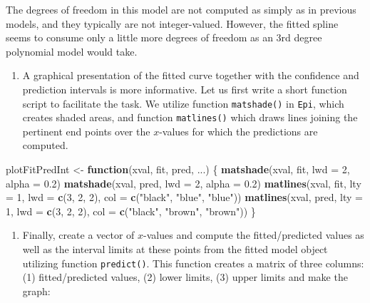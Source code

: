 \documentclass[
]{book}
\newenvironment{Shaded}{\begin{snugshade}}{\end{snugshade}}
\newcommand{\AttributeTok}[1]{\textcolor[rgb]{0.13,0.29,0.53}{#1}}
\newcommand{\ControlFlowTok}[1]{\textcolor[rgb]{0.13,0.29,0.53}{\textbf{#1}}}
\newcommand{\DecValTok}[1]{\textcolor[rgb]{0.00,0.00,0.81}{#1}}
\newcommand{\FloatTok}[1]{\textcolor[rgb]{0.00,0.00,0.81}{#1}}
\newcommand{\FunctionTok}[1]{\textcolor[rgb]{0.13,0.29,0.53}{\textbf{#1}}}
\newcommand{\NormalTok}[1]{#1}
\newcommand{\OtherTok}[1]{\textcolor[rgb]{0.56,0.35,0.01}{#1}}
\newcommand{\StringTok}[1]{\textcolor[rgb]{0.31,0.60,0.02}{#1}}
\providecommand{\tightlist}{%
  \setlength{\itemsep}{0pt}\setlength{\parskip}{0pt}}
\begin{document}
The degrees of freedom in this model are not computed as simply as in previous
models, and they typically are not integer-valued. However,
the fitted spline seems to consume only a little more degrees of freedom
as an 3rd degree polynomial model would take.

\begin{enumerate}
\def\labelenumi{\arabic{enumi}.}
\setcounter{enumi}{1}
\tightlist
\item
  A graphical presentation of the fitted curve together with the
  confidence and prediction intervals is more informative.
  Let us first write a
  short function script to facilitate the task. We utilize function \texttt{matshade()} in \texttt{Epi}, which creates shaded areas, and function \texttt{matlines()} which draws
  lines joining the pertinent end points over the \(x\)-values for which the
  predictions are computed.
\end{enumerate}

\begin{Shaded}
\begin{Highlighting}[]
\NormalTok{plotFitPredInt }\OtherTok{\textless{}{-}} \ControlFlowTok{function}\NormalTok{(xval, fit, pred, ...) \{}
  \FunctionTok{matshade}\NormalTok{(xval, fit, }\AttributeTok{lwd =} \DecValTok{2}\NormalTok{, }\AttributeTok{alpha =} \FloatTok{0.2}\NormalTok{)}
  \FunctionTok{matshade}\NormalTok{(xval, pred, }\AttributeTok{lwd =} \DecValTok{2}\NormalTok{, }\AttributeTok{alpha =} \FloatTok{0.2}\NormalTok{)}
  \FunctionTok{matlines}\NormalTok{(xval, fit, }\AttributeTok{lty =} \DecValTok{1}\NormalTok{, }\AttributeTok{lwd =} \FunctionTok{c}\NormalTok{(}\DecValTok{3}\NormalTok{, }\DecValTok{2}\NormalTok{, }\DecValTok{2}\NormalTok{), }\AttributeTok{col =} \FunctionTok{c}\NormalTok{(}\StringTok{"black"}\NormalTok{, }\StringTok{"blue"}\NormalTok{, }\StringTok{"blue"}\NormalTok{))}
  \FunctionTok{matlines}\NormalTok{(xval, pred, }\AttributeTok{lty =} \DecValTok{1}\NormalTok{, }\AttributeTok{lwd =} \FunctionTok{c}\NormalTok{(}\DecValTok{3}\NormalTok{, }\DecValTok{2}\NormalTok{, }\DecValTok{2}\NormalTok{), }\AttributeTok{col =} \FunctionTok{c}\NormalTok{(}\StringTok{"black"}\NormalTok{, }\StringTok{"brown"}\NormalTok{, }\StringTok{"brown"}\NormalTok{))}
\NormalTok{\}}
\end{Highlighting}
\end{Shaded}

\begin{enumerate}
\def\labelenumi{\arabic{enumi}.}
\setcounter{enumi}{2}
\tightlist
\item
  Finally, create a vector of \(x\)-values and compute
  the fitted/predicted values as well
  as the interval limits at these points from the fitted
  model object utilizing
  function \texttt{predict()}.
  This function creates a matrix of three columns: (1) fitted/predicted
  values, (2) lower limits, (3) upper limits and
  make the graph:
\end{enumerate}
\end{document}
